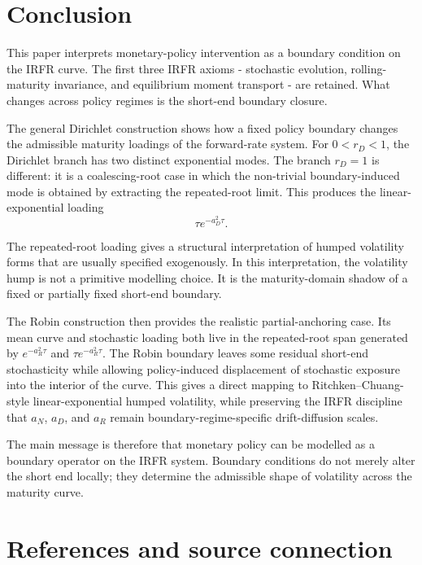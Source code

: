 \documentclass[11pt]{article}
\numberwithin{equation}{section}
\begin{document}
\section{Conclusion}

This paper interprets monetary-policy intervention as a boundary condition on the IRFR curve. The first three IRFR axioms - stochastic evolution, rolling-maturity invariance, and equilibrium moment transport - are retained. What changes across policy regimes is the short-end boundary closure.

The general Dirichlet construction shows how a fixed policy boundary changes the admissible maturity loadings of the forward-rate system. For $0<r_D<1$, the Dirichlet branch has two distinct exponential modes. The branch $r_D=1$ is different: it is a coalescing-root case in which the non-trivial boundary-induced mode is obtained by extracting the repeated-root limit. This produces the linear-exponential loading
\begin{equation}
\tau e^{-a_D^2\tau}.
\end{equation}

The repeated-root loading gives a structural interpretation of humped volatility forms that are usually specified exogenously. In this interpretation, the volatility hump is not a primitive modelling choice. It is the maturity-domain shadow of a fixed or partially fixed short-end boundary.

The Robin construction then provides the realistic partial-anchoring case. Its mean curve and stochastic loading both live in the repeated-root span generated by $e^{-a_R^2\tau}$ and $\tau e^{-a_R^2\tau}$. The Robin boundary leaves some residual short-end stochasticity while allowing policy-induced displacement of stochastic exposure into the interior of the curve. This gives a direct mapping to Ritchken--Chuang-style linear-exponential humped volatility, while preserving the IRFR discipline that $a_N$, $a_D$, and $a_R$ remain boundary-regime-specific drift-diffusion scales.

The main message is therefore that monetary policy can be modelled as a boundary operator on the IRFR system. Boundary conditions do not merely alter the short end locally; they determine the admissible shape of volatility across the maturity curve.

\section*{References and source connection}
\end{document}
